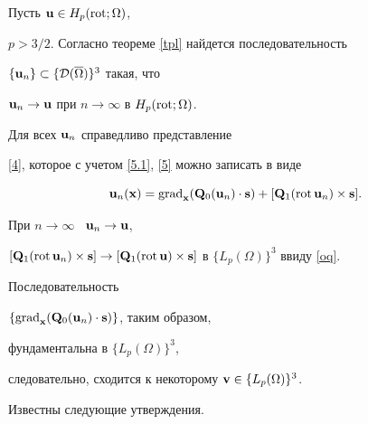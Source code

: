\begin{pf}


Пусть $\bold{u}\in H_p(\operatorname{rot};\Omega)$,


$p>3/2$. Согласно теореме \ref{tpl} найдется последовательность


$\{\bold{u}_n\}\subset\{{\cal D}(\overline{\Omega})\}^3$ такая, что


$\bold{u}_n\to\bold{u}$ при $n\to\infty$ в $H_p(\operatorname{rot};\Omega)$.


Для всех $\bold{u}_n$ справедливо представление


\eqref{4}, которое с учетом \eqref{5.1}, \eqref{5} можно записать в виде


\begin{equation}


\bold{u}_n(\bold{x})=\Grad_{\bold{x}}(\bold{Q}_0(\bold{u}_n)\cdot\bold{s})+


[\bold{Q}_1(\Rot \bold{u}_n)\times\bold{s}].


\label{b2}


\end{equation}


При $n\to\infty$ \ $\bold{u}_n\to\bold{u}$,


$[\bold{Q}_1(\Rot\bold{u}_n)\times\bold{s}]\to[\bold{Q}_1(


\Rot\bold{u})\times\bold{s}]$ в $\{L_p(\Omega)\}^3$ ввиду \eqref{oq}.





Последовательность


$\{\operatorname{grad}_{\bold{x}}(\bold{Q}_0(\bold{u}_n)\cdot\bold{s})\}$, таким образом,


фундаментальна в $\{L_p(\Omega)\}^3$,


следовательно, сходится к некоторому $\bold{v}\in\{L_p(\Omega)\}^3$.


Известны следующие утверждения.





\end{pf}
